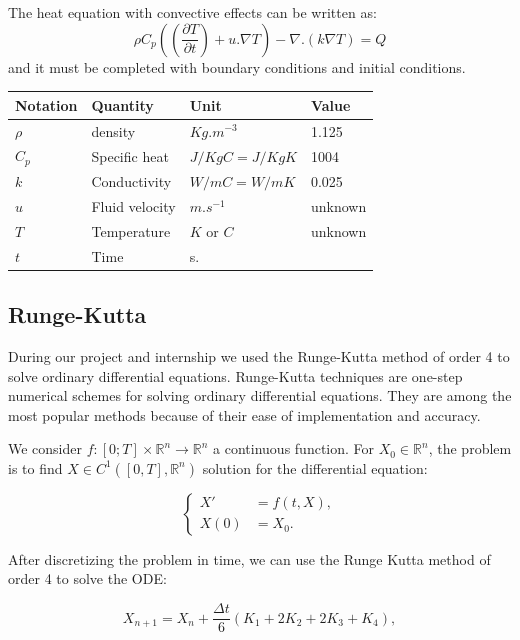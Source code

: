 \documentclass[12pt]{article}
\begin{document}
	\noindent The heat equation with convective effects can be written as:
    $$\rho C_p((\frac{\partial T}{\partial t})+u . \nabla T)-\nabla .(k \nabla T)=Q$$
    and it must be completed  with boundary conditions and initial conditions.
    \newline
	\renewcommand{\arraystretch}{2}
    \begin{tabular}{|R{3cm}|C{3cm}|L{3cm}|L{3cm}|}
    \hline
    Notation & Quantity &Unit & Value   \\
    \hline
    $\rho$ & density & $Kg.m^
    {-3}$ & 1.125  \\[4cm]
    \hline
    $C_p$ & Specific heat & $J/KgC=J/KgK$ & 1004 \\[4cm]
    \hline
    $k$ & Conductivity & $W/mC=W/mK$ & 0.025 \\[4cm]
    \hline
    $u$ & Fluid velocity & $m.s^{-1}$  & unknown \\[4cm]
    \hline
    $T$ & Temperature & $K$ or $C$  & unknown \\[4cm]
    \hline
    $t$ & Time & s. &   \\[4cm]
    \hline
\end{tabular}

	\newpage

    \subsection{Runge-Kutta}
    \label{rk4}
    \noindent During our project and internship we used the Runge-Kutta method of order 4 to solve ordinary differential equations. Runge-Kutta techniques are one-step numerical schemes for solving ordinary differential equations. They are among the most popular methods because of their ease of implementation and accuracy.
    
    \noindent We consider $f : [0; T] \times \mathbb{R}^n \rightarrow \mathbb{R}^n$ a continuous function. For $X_0\in \mathbb{R}^n$, the problem is to find  $X\in C^1([0,T],\mathbb{R}^n)$ solution for the differential equation:
	
	$$\left\{\begin{aligned}
		X'&=f(t,X), \\
		X(0)&=X_0.
	\end{aligned}\right.$$
	
	
	 \noindent After discretizing the problem in time, we can use the Runge Kutta method of order 4 to solve the ODE:
		
		$$X_{n+1}=X_n+\frac{\Delta t}{6}\left(K_1+2K_2+2K_3+K_4\right) ,$$
		
\end{document}
